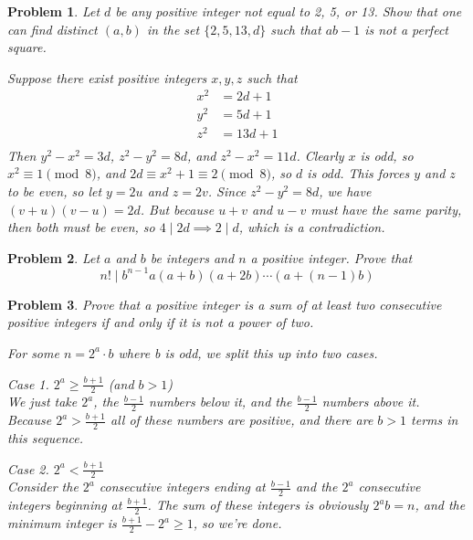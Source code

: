 \documentclass{scrartcl}
\newtheorem{a_problem}{Problem}
\begin{document}
\begin{a_problem}
Let $d$ be any positive integer not equal to 2, 5, or 13. Show that one can find distinct $(a,b)$ in the set $\{2,5,13,d\}$ such that $ab-1$ is not a perfect square.
	\begin{soln}
		Suppose there exist positive integers $x,y,z$ such that
		\begin{align*}
			x^2 &= 2d+1 \\
			y^2 &= 5d+1 \\
			z^2 &= 13d+1 \\
		\end{align*}
		Then $y^2-x^2 = 3d$, $z^2 - y^2 = 8d$, and $z^2 - x^2 = 11d$.
		Clearly $x$ is odd, so $x^2 \equiv 1 \pmod 8$, and $2d \equiv x^2 + 1 \equiv 2 \pmod 8$, so $d$ is odd. This forces $y$ and $z$ to be even, so let $y=2u$ and $z=2v$. Since $z^2 - y^2 = 8d$, we have $(v+u)(v-u) = 2d$. But because $u+v$ and $u-v$ must have the same parity, then both must be even, so $4 \mid 2d \implies 2 \mid d$, which is a contradiction.
			
	\end{soln}
\end{a_problem}

\begin{a_problem}
	Let $a$ and $b$ be integers and $n$ a positive integer. Prove that 
	\[n! \mid b^{n-1}a(a+b)(a+2b)\cdots(a+(n-1)b)\]
\end{a_problem}

\begin{a_problem}
	Prove that a positive integer is a sum of at least two consecutive positive integers if and only if it is not a power of two.
	\begin{soln}
		For some $n=2^a \cdot b$ where b is odd, we split this up into two cases. 

		Case 1. $2^a \geq \frac{b+1}{2} $ (and $b > 1$) \\
		We just take $2^a$, the $\frac{b-1}{2}$ numbers below it, and the $\frac{b-1}{2}$ numbers above it. Because $2^a > \frac{b+1}{2}$ all of these numbers are positive, and there are $b > 1$ terms in this sequence.

		Case 2. $2^a < \frac{b+1}{2} $ \\
		Consider the $2^a$ consecutive integers ending at $\frac{b-1}{2}$ and the $2^a$ consecutive integers beginning at $\frac{b+1}{2}$. The sum of these integers is obviously $2^{a}b = n$, and the minimum integer is $\frac{b+1}{2} - 2^a \geq 1$, so we're done.
	\end{soln}
\end{a_problem}
\end{document}
